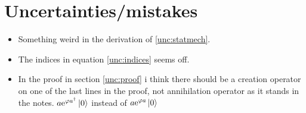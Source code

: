 \section{Uncertainties/mistakes}

\begin{itemize}
\item Something weird in the derivation of \eqref{unc:statmech}.
\item The indices in equation \eqref{unc:indices} seems off.  
\item In the proof in section \ref{unc:proof} i think there should be a creation operator on one of the last lines in the proof, not annihilation operator as it stands in the notes. $a\mathrm{e}^{\varphi a^\dagger}\ket{0}$ instead of $a\mathrm{e}^{\varphi a}\ket{0}$

\end{itemize}